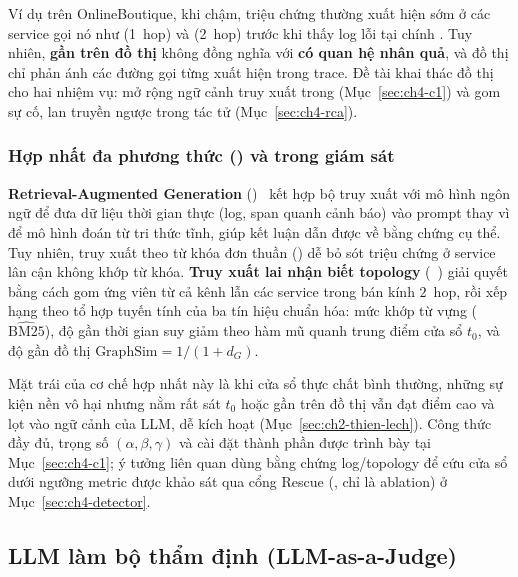 Ví dụ trên OnlineBoutique, khi  chậm, triệu chứng thường xuất hiện sớm ở các service gọi nó như  (1~hop) và  (2~hop) trước khi thấy log lỗi tại chính . Tuy nhiên, \textbf{gần trên đồ thị} không đồng nghĩa với \textbf{có quan hệ nhân quả}, và đồ thị chỉ phản ánh các đường gọi từng xuất hiện trong trace. Đề tài khai thác đồ thị cho hai nhiệm vụ: mở rộng ngữ cảnh truy xuất trong \CTAV{} (Mục~\ref{sec:ch4-c1}) và gom sự cố, lan truyền ngược trong tác tử  (Mục~\ref{sec:ch4-rca}).

\subsubsection{Hợp nhất đa phương thức () và  trong giám sát}
\label{sec:ch2-fusion}
\label{sec:ch2-rag}

\textbf{Retrieval-Augmented Generation} ()~\cite{lewis2020rag} kết hợp bộ truy xuất với mô hình ngôn ngữ để đưa dữ liệu thời gian thực (log, span quanh cảnh báo) vào prompt thay vì để mô hình đoán từ tri thức tĩnh, giúp kết luận dẫn được về bằng chứng cụ thể. Tuy nhiên, truy xuất theo từ khóa đơn thuần () dễ bỏ sót triệu chứng ở service lân cận không khớp từ khóa. \textbf{Truy xuất lai nhận biết topology} (~\cite{icaetm2026}) giải quyết bằng cách gom ứng viên từ cả kênh  lẫn các service trong bán kính $2$~hop, rồi xếp hạng theo tổ hợp tuyến tính của ba tín hiệu chuẩn hóa: mức khớp từ vựng ($\widehat{\text{BM25}}$), độ gần thời gian suy giảm theo hàm mũ quanh trung điểm cửa sổ $t_0$, và độ gần đồ thị $\text{GraphSim} = 1 / (1 + d_G)$.

Mặt trái của cơ chế hợp nhất này là khi cửa sổ thực chất bình thường, những sự kiện nền vô hại nhưng nằm rất sát $t_0$ hoặc gần trên đồ thị vẫn đạt điểm cao và lọt vào ngữ cảnh của LLM, dễ kích hoạt  (Mục~\ref{sec:ch2-thien-lech}). Công thức  đầy đủ, trọng số $(\alpha, \beta, \gamma)$ và cài đặt thành phần  được trình bày tại Mục~\ref{sec:ch4-c1}; ý tưởng liên quan dùng bằng chứng log/topology để cứu cửa sổ dưới ngưỡng metric được khảo sát qua cổng Rescue (, chỉ là ablation) ở Mục~\ref{sec:ch4-detector}.

\subsection{LLM làm bộ thẩm định (LLM-as-a-Judge)}
\label{sec:ch2-judge}

